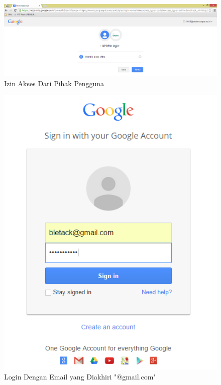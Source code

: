 \begin{figure}[H]
\centering
\includegraphics[scale=0.44]{Gambar/pengujian5.png}
\caption[Izin Akses Dari Pihak Pengguna]{Izin Akses Dari Pihak Pengguna} 
\label{fig:izindaripihakpengguna}
\end{figure}

\begin{figure}[H]
\centering
\includegraphics[scale=0.44]{Gambar/pengujian6.png}
\caption[Login Dengan Email yang Diakhiri "@gmail.com"]{Login Dengan Email yang
Diakhiri "@gmail.com"}
\label{fig:logindengangmail}
\end{figure}


